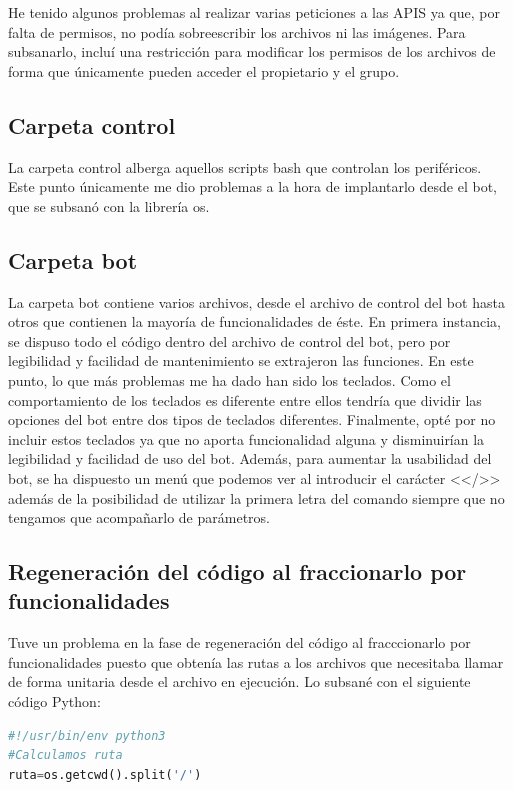 He tenido algunos problemas al realizar varias peticiones a las APIS ya que, por falta de permisos, no podía sobreescribir los archivos ni las imágenes. Para subsanarlo, incluí una restricción para modificar los permisos de los archivos de forma que únicamente pueden acceder el propietario y el grupo.

\subsection{Carpeta control}
La carpeta control alberga aquellos scripts bash que controlan los periféricos. Este punto únicamente me dio problemas a la hora de implantarlo desde el bot, que se subsanó con la librería os.

\subsection{Carpeta bot}
La carpeta bot contiene varios archivos, desde el archivo de control del bot hasta otros que contienen la mayoría de funcionalidades de éste. En primera instancia, se dispuso todo el código dentro del archivo de control del bot, pero por legibilidad y facilidad de mantenimiento se extrajeron las funciones.
En este punto, lo que más problemas me ha dado han sido los teclados. Como el comportamiento de los teclados es diferente entre ellos tendría que dividir las opciones del bot entre dos tipos de teclados diferentes. Finalmente, opté por no incluir estos teclados ya que no aporta funcionalidad alguna y disminuirían la legibilidad y facilidad de uso del bot. Además, para aumentar la usabilidad del bot, se ha dispuesto un menú que podemos ver al introducir el carácter <</>> además de la posibilidad de utilizar la primera letra del comando siempre que no tengamos que acompañarlo de parámetros.


\subsection{Regeneración del código al fraccionarlo por funcionalidades}

Tuve un problema en la fase de regeneración del código al fracccionarlo por funcionalidades puesto que obtenía las rutas a los archivos que necesitaba llamar de forma unitaria desde el archivo en ejecución.  Lo subsané con el siguiente código Python:
\begin{lstlisting}[language=python, firstnumber=0, basicstyle=\small]
#!/usr/bin/env python3
#Calculamos ruta
ruta=os.getcwd().split('/')
\end{lstlisting}

